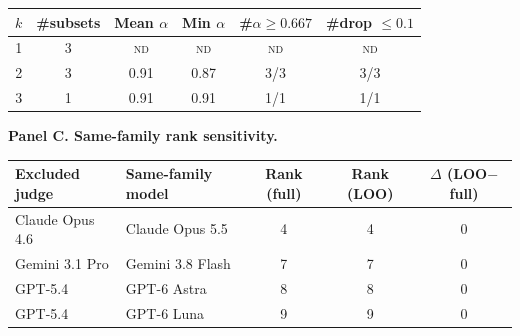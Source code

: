 \vspace{0.5em}

\begin{tabular}{cccccc}
\toprule
$k$ & \#subsets & Mean $\alpha$ & Min $\alpha$ & \#$\alpha \geq 0.667$ & \#drop $\leq 0.1$ \\
\midrule
1 & 3 & \textsc{nd} & \textsc{nd} & \textsc{nd} & \textsc{nd} \\
2 & 3 & 0.91 & 0.87 & 3/3 & 3/3 \\
3 & 1 & 0.91 & 0.91 & 1/1 & 1/1 \\
\bottomrule
\end{tabular}

\vspace{0.75em}
\textbf{Panel C. Same-family rank sensitivity.}
\vspace{0.25em}

\begin{tabular}{llccc}
\toprule
Excluded judge & Same-family model & Rank (full) & Rank (LOO) & $\Delta$ (LOO$-$full) \\
\midrule
Claude Opus 4.6 & Claude Opus 5.5 & 4 & 4 & 0 \\
Gemini 3.1 Pro & Gemini 3.8 Flash & 7 & 7 & 0 \\
GPT-5.4 & GPT-6 Astra & 8 & 8 & 0 \\
GPT-5.4 & GPT-6 Luna & 9 & 9 & 0 \\
\bottomrule
\end{tabular}
